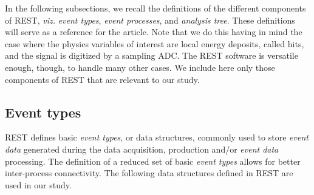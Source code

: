 In the following subsections, we recall the definitions of the different components of REST, \emph{viz.} \emph{event types}, \emph{event processes}, and \emph{analysis tree}. These definitions will serve as a reference for the article. Note that we do this having in mind the case where the physics variables of interest are local energy deposits, called hits, and the signal is digitized by a sampling ADC. The REST software is versatile enough, though, to handle many other cases. We include here only those components of REST that are relevant to our study.

\subsection{Event types}

REST defines basic \emph{event types}, or data structures, commonly used to store \emph{event data} generated during the data acquisition, production and/or \emph{event data} processing. The definition of a reduced set of basic \emph{event types} allows for better inter-process connectivity. The following data structures defined in REST are used in our study.

